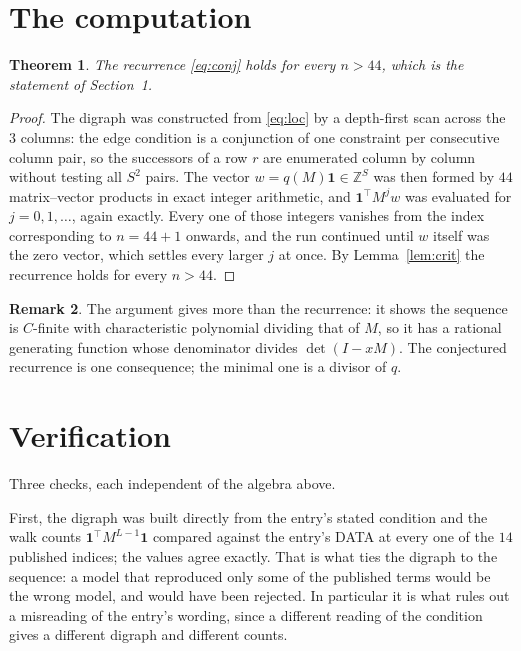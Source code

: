 \documentclass[11pt,a4paper]{article}
\theoremstyle{plain}
\newtheorem{theorem}{Theorem}
\theoremstyle{definition}
\newtheorem{remark}[theorem]{Remark}
\begin{document}
\section{The computation}

\begin{theorem}
The recurrence \eqref{eq:conj} holds for every $n>44$, which is the statement of
Section~1.
\end{theorem}

\begin{proof}
The digraph was constructed from \eqref{eq:loc} by a depth-first scan across the $3$
columns: the edge condition is a conjunction of one constraint per consecutive column
pair, so the successors of a row $r$ are enumerated column by column without testing all
$S^2$ pairs. The vector $w=q(M)\mathbf{1}\in\mathbb{Z}^{S}$ was then formed by $44$
matrix--vector products in exact integer arithmetic, and $\mathbf{1}^{\!\top}M^{j}w$ was
evaluated for $j=0,1,\dots$, again exactly. Every one of those integers vanishes from the
index corresponding to $n=44+1$ onwards, and the run continued until $w$ itself was the
zero vector, which settles every larger $j$ at once. By Lemma~\ref{lem:crit} the recurrence
holds for every $n>44$.
\end{proof}

\begin{remark}
The argument gives more than the recurrence: it shows the sequence is $C$-finite with
characteristic polynomial dividing that of $M$, so it has a rational generating function
whose denominator divides $\det(I-xM)$. The conjectured recurrence is one consequence; the
minimal one is a divisor of $q$.
\end{remark}

\section{Verification}

Three checks, each independent of the algebra above.

First, the digraph was built directly from the entry's stated condition and the walk counts
$\mathbf{1}^{\!\top}M^{L-1}\mathbf{1}$ compared against the entry's DATA at
every one of the $14$ published indices; the values agree exactly. That is what ties
the digraph to the sequence: a model that reproduced only some of the published terms would
be the wrong model, and would have been rejected. In particular it is what rules out a
misreading of the entry's wording, since a different reading of the condition gives a
different digraph and different counts.
\end{document}
